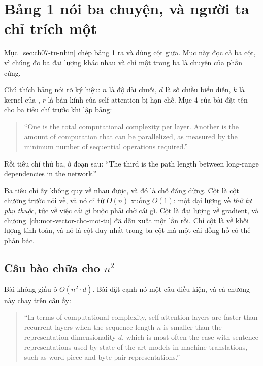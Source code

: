 \section{Bảng 1 nói ba chuyện, và người ta chỉ trích một}
\label{sec:ch08-bang-mot}

%
Mục~\ref{sec:ch07-tu-nhin} chép bảng 1 ra và dùng cột giữa. Mục này đọc cả ba
cột, vì chúng đo ba đại lượng khác nhau và chỉ một trong ba là chuyện của phần
cứng.

Chú thích bảng nói rõ ký hiệu: \(n\) là độ dài chuỗi, \(d\) là số chiều biểu
diễn, \(k\) là kernel của , \(r\) là bán kính của
self-attention bị hạn
chế. Mục 4 của bài đặt tên cho ba tiêu chí trước khi lập bảng:

\begin{quote}
\enquote{One is the total computational complexity per layer. Another is the
amount of computation that can be parallelized, as measured by the minimum
number of sequential operations required.}
\end{quote}

Rồi tiêu chí thứ ba, ở đoạn sau: \enquote{The third is the path length between
long-range dependencies in the network.}

Ba tiêu chí ấy không quy về nhau được, và đó là chỗ đáng dừng. Cột
 là cột chương trước nói về, và nó đi từ \(O(n)\)
xuống \(O(1)\): một đại lượng về \emph{thứ tự phụ thuộc}, tức về việc cái gì
buộc phải chờ cái gì. Cột  là đại lượng về gradient,
và chương~\ref{ch:mot-vector-cho-moi-tu} đã dẫn xuất một lần rồi. Chỉ cột
 là về khối lượng tính toán, và nó là cột duy nhất
trong ba cột mà một cái đồng hồ có thể phản bác.

\subsection*{Câu bào chữa cho \texorpdfstring{\(n^2\)}{n2}}

%
Bài không giấu ô \(O(n^2 \cdot d)\). Bài đặt cạnh nó một câu điều kiện, và cả
chương này chạy trên câu ấy:

\begin{quote}
\enquote{In terms of computational complexity, self-attention layers are faster
than recurrent layers when the sequence length \(n\) is smaller than the
representation dimensionality \(d\), which is most often the case with sentence
representations used by state-of-the-art models in machine translations, such as
word-piece and byte-pair representations.}
\end{quote}


